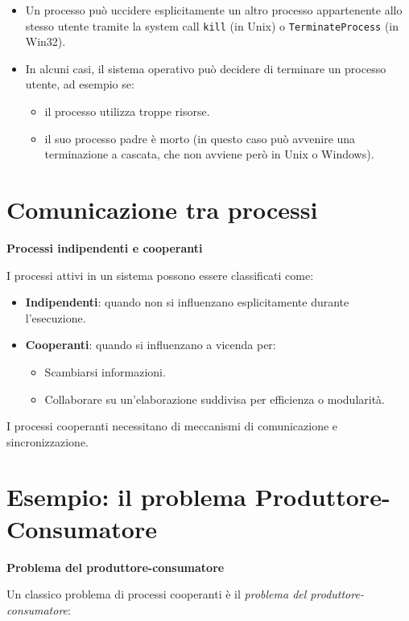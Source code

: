 \begin{itemize}
    \item Un processo può uccidere esplicitamente un altro processo appartenente allo stesso utente tramite la system call \texttt{kill} (in Unix) o \texttt{TerminateProcess} (in Win32).
    \item In alcuni casi, il sistema operativo può decidere di terminare un processo utente, ad esempio se:
    \begin{itemize}
        \item il processo utilizza troppe risorse.
        \item il suo processo padre è morto (in questo caso può avvenire una terminazione a cascata, che non avviene però in Unix o Windows).
    \end{itemize}
\end{itemize}

\section{Comunicazione tra processi}
\textbf{Processi indipendenti e cooperanti}

I processi attivi in un sistema possono essere classificati come:

\begin{itemize}
    \item \textbf{Indipendenti}: quando non si influenzano esplicitamente durante l'esecuzione.
    \item \textbf{Cooperanti}: quando si influenzano a vicenda per:
    \begin{itemize}
        \item Scambiarsi informazioni.
        \item Collaborare su un'elaborazione suddivisa per efficienza o modularità.
    \end{itemize}
\end{itemize}

I processi cooperanti necessitano di meccanismi di comunicazione e sincronizzazione.

\section{Esempio: il problema Produttore-Consumatore}
\textbf{Problema del produttore-consumatore}

Un classico problema di processi cooperanti è il \textit{problema del produttore-consumatore}:

